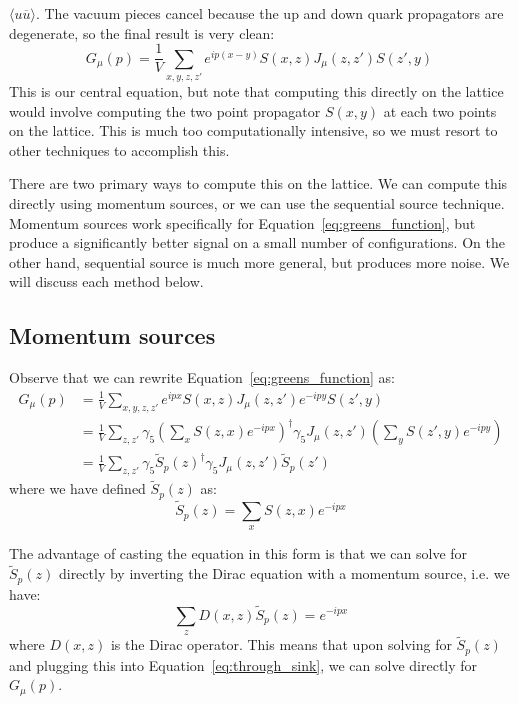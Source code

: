 \documentclass[11pt, oneside]{article}   	%
\theoremstyle{definition}
\begin{document}
$\langle u\overline u\rangle$. The vacuum pieces cancel because the up and down quark propagators are degenerate, so the 
final result is very clean:
\begin{equation}
	G_\mu(p) = \frac{1}{V}\sum_{x, y, z, z'}e^{ip(x - y)} S(x, z) J_\mu (z, z') S(z', y)~
	\label{eq:greens_function}
\end{equation}
This is our central equation, but note that computing this directly on the lattice would involve computing the two point 
propagator $S(x, y)$ at each two points on the lattice. This is much too computationally intensive, so we must resort to 
other techniques to accomplish this. 

There are two primary ways to compute this on the lattice.
We can compute this directly using momentum sources, or 
we can use the sequential source technique. Momentum sources work specifically for Equation~\ref{eq:greens_function}, 
but produce a significantly better signal on a small number of configurations. On the other hand, sequential source 
is much more general, but produces more noise. We will discuss each method below.

\subsection{Momentum sources}

Observe that we can rewrite Equation~\ref{eq:greens_function} as:
\begin{align}
	G_\mu(p) &= \frac{1}{V}\sum_{x, y, z, z'} e^{ipx} S(x, z) J_\mu(z, z') e^{-ipy} S(z', y) \nonumber\\
	&= \frac{1}{V}\sum_{z, z'}\gamma_5\left(\sum_x S(z, x) e^{-ipx}\right)^\dagger\gamma_5 J_\mu(z, z') \left(\sum_y S(z', y) 
	e^{-ipy} \right) \nonumber\\
	&= \frac{1}{V}\sum_{z, z'} \gamma_5 \tilde S_p(z)^\dagger \gamma_5 J_\mu(z, z') \tilde S_p(z')~
	\label{eq:through_sink}
\end{align}
where we have defined $\tilde S_p(z)$ as:
\begin{equation}
	\tilde S_p(z) = \sum_x S(z, x) e^{-ipx}
\end{equation}

The advantage of casting the equation in this form is that we can solve for $\tilde S_p(z)$ directly by inverting the Dirac 
equation with a momentum source, i.e. we have:
\begin{equation}
	\sum_{z} D(x, z) \tilde S_p(z) = e^{-ipx}
\end{equation}
where $D(x, z)$ is the Dirac operator. This means that upon solving for $\tilde S_p(z)$ and plugging this into 
Equation~\ref{eq:through_sink}, we can solve directly for $G_\mu(p)$. 
\end{document}
